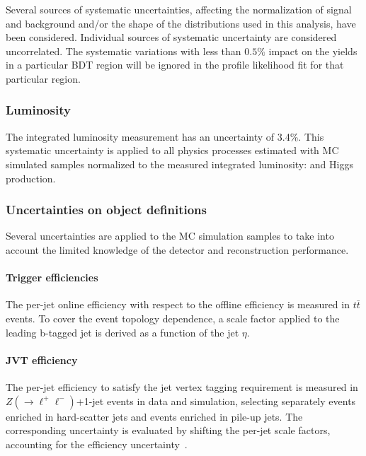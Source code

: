 \label{sec:vbf-uncertainties}

Several sources of systematic uncertainties,
affecting the normalization of signal and background and/or the shape of
the distributions used in this analysis, have been considered.  Individual sources of systematic 
uncertainty are considered uncorrelated. The systematic variations with less than $0.5\%$ impact 
on the yields in a particular BDT region will be ignored in the profile likelihood fit for 
that particular region. 

\subsubsection{Luminosity}
\label{sec:vbf-syst_lumi}

The integrated luminosity measurement has an uncertainty of 3.4\%. This systematic uncertainty
is applied to all physics processes estimated with MC simulated samples normalized 
to the measured integrated luminosity: \zjets{} and Higgs production.

\subsubsection{Uncertainties on object definitions}
\label{sec:vbf-syst_objects}

Several uncertainties are applied to the MC simulation samples to take into account the limited knowledge of the detector and reconstruction performance.

\paragraph{Trigger efficiencies}

The per-jet online \btagging efficiency with respect to the offline \btagging efficiency is measured in $t\bar t$ events. 
To cover the event topology dependence, a scale factor applied to the leading b-tagged jet is derived as a function of the jet $\eta$. 

\paragraph{JVT efficiency}
The per-jet efficiency to satisfy the jet vertex tagging requirement
is measured in $Z(\to \ell^+\ell^-)$+1-jet events in data and simulation,
selecting separately events enriched in hard-scatter jets and events enriched in pile-up jets. 
The corresponding uncertainty is evaluated by shifting the per-jet scale factors,
accounting for the efficiency uncertainty~\cite{JVTwiki}.

